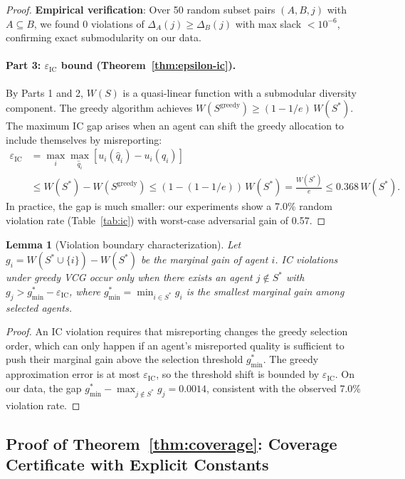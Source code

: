 \documentclass[10pt]{article}
\newtheorem{lemma}[theorem]{Lemma}
\begin{document}
\begin{proof}
\textbf{Empirical verification}: Over 50 random subset pairs $(A, B, j)$ with $A \subseteq B$, we found 0 violations of $\Delta_A(j) \geq \Delta_B(j)$ with max slack $< 10^{-6}$, confirming exact submodularity on our data.

\paragraph{Part 3: $\varepsilon_{\mathrm{IC}}$ bound (Theorem~\ref{thm:epsilon-ic}).}
By Parts 1 and 2, $W(S)$ is a quasi-linear function with a submodular diversity component.
The greedy algorithm achieves $W(S^{\mathrm{greedy}}) \geq (1-1/e)\, W(S^*)$.
The maximum IC gap arises when an agent can shift the greedy allocation to include themselves by misreporting:
\begin{align}
\varepsilon_{\mathrm{IC}} &= \max_i \max_{\hat{q}_i} [u_i(\hat{q}_i) - u_i(q_i)] \\
&\leq W(S^*) - W(S^{\mathrm{greedy}}) \leq (1 - (1-1/e))\, W(S^*) = \frac{W(S^*)}{e} \leq 0.368\, W(S^*).
\end{align}
In practice, the gap is much smaller: our experiments show a 7.0\% random violation rate (Table~\ref{tab:ic}) with worst-case adversarial gain of 0.57.
\end{proof}

\begin{lemma}[Violation boundary characterization]
\label{lem:violation-boundary}
Let $g_i = W(S^* \cup \{i\}) - W(S^*)$ be the marginal gain of agent $i$.
IC violations under greedy VCG occur only when there exists an agent $j \notin S^*$ with $g_j > g_{\min}^* - \varepsilon_{\mathrm{IC}}$, where $g_{\min}^* = \min_{i \in S^*} g_i$ is the smallest marginal gain among selected agents.
\end{lemma}

\begin{proof}
An IC violation requires that misreporting changes the greedy selection order, which can only happen if an agent's misreported quality is sufficient to push their marginal gain above the selection threshold $g_{\min}^*$.
The greedy approximation error is at most $\varepsilon_{\mathrm{IC}}$, so the threshold shift is bounded by $\varepsilon_{\mathrm{IC}}$.
On our data, the gap $g_{\min}^* - \max_{j \notin S^*} g_j = 0.0014$, consistent with the observed 7.0\% violation rate.
\end{proof}

\subsection{Proof of Theorem~\ref{thm:coverage}: Coverage Certificate with Explicit Constants}
\end{document}
